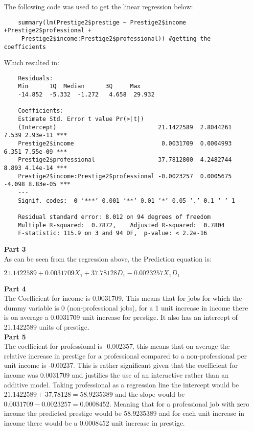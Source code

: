 \documentclass{article}
\begin{document}
The following code was used to get the linear regression below:
\begin{verbatim}
	summary(lm(Prestige2$prestige ~ Prestige2$income +Prestige2$professional +
	 Prestige2$income:Prestige2$professional)) #getting the coefficients
\end{verbatim}
Which resulted in:
\pagebreak
\begin{verbatim}
	Residuals:
	Min      1Q  Median      3Q     Max 
	-14.852  -5.332  -1.272   4.658  29.932 
	
	Coefficients:
	Estimate Std. Error t value Pr(>|t|)    
	(Intercept)                             21.1422589  2.8044261   7.539 2.93e-11 ***
	Prestige2$income                         0.0031709  0.0004993   6.351 7.55e-09 ***
	Prestige2$professional                  37.7812800  4.2482744   8.893 4.14e-14 ***
	Prestige2$income:Prestige2$professional -0.0023257  0.0005675  -4.098 8.83e-05 ***
	---
	Signif. codes:  0 ‘***’ 0.001 ‘**’ 0.01 ‘*’ 0.05 ‘.’ 0.1 ‘ ’ 1
	
	Residual standard error: 8.012 on 94 degrees of freedom
	Multiple R-squared:  0.7872,	Adjusted R-squared:  0.7804 
	F-statistic: 115.9 on 3 and 94 DF,  p-value: < 2.2e-16
\end{verbatim} 
	
\vspace{10mm}
\noindent\textbf{\large Part 3\\}
As can be seen from the regression above, the Prediction equation is:
\begin{center}
	$21.1422589+0.0031709X_{1}+37.78128D_{1}-0.0023257X_{1}D_{1}$
\end{center}
	
	
\vspace{10mm}
\noindent\textbf{\large Part 4\\}
The Coefficient for income is 0.0031709. This means that for jobs for which the dummy variable is 0 (non-professional jobs), for a 1 unit increase in income there is on average a 0.0031709 unit increase for prestige. It also has an intercept of 21.1422589 units of prestige.\\
	
\vspace{10mm}
\noindent\textbf{\large Part 5\\}	
The coefficient for professional is -0.002357, this means that on average the relative increase in prestige for a professional compared to a non-professional per unit income is -0.00237. This is rather significant given that the coefficient for income was 0.0031709 and justifies the use of an interactive rather than an additive model. Taking professional as a regression line the intercept would be $21.1422589 + 37.78128 = 58.9235389$ and the slope would be $ 0.0031709 - 0.0023257 = 0.0008452$. Meaning that for a professional job with zero income the predicted prestige would be 58.9235389 and for each unit increase in income there would be a 0.0008452 unit increase in prestige.
	
\end{document}
